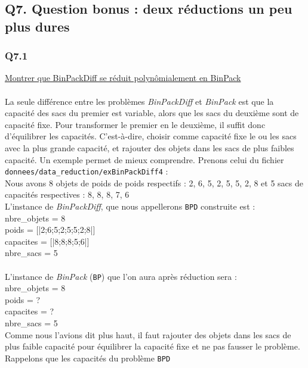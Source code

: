\subsection*{Q7. Question bonus : deux réductions un peu plus dures}


\subsubsection{Q7.1}

\underline{Montrer que BinPackDiff se réduit polynômialement en BinPack}
~\\~\\
La seule différence entre les problèmes \textit{BinPackDiff} et \textit{BinPack} est que la capacité des sacs du premier est variable, alors que les sacs du deuxième sont de capacité fixe. Pour transformer le premier en le deuxième, il suffit donc d'équilibrer les capacités. C'est-à-dire, choisir comme capacité fixe le ou les sacs avec la plus grande capacité, et rajouter des objets dans les sacs de plus faibles capacité. Un exemple permet de mieux comprendre. Prenons celui du fichier \verb+donnees/data_reduction/exBinPackDiff4+ :\\
Nous avons 8 objets de poids de poids respectifs : 2, 6, 5, 2, 5, 5, 2, 8 et 5 sacs de capacités respectives : 8, 8, 8, 7, 6\\
L'instance de \textit{BinPackDiff}, que nous appellerons \verb+BPD+ construite est :\\
nbre\_objets = 8\\
poids = [|2;6;5;2;5;5;2;8|]\\
capacites = [|8;8;8;5;6|]\\
nbre\_sacs = 5
~\\~\\
L'instance de \textit{BinPack} (\verb+BP+) que l'on aura après réduction sera :\\
nbre\_objets = 8\\
poids = ?\\
capacites = ?\\
nbre\_sacs = 5
~\\

Comme nous l'avions dit plus haut, il faut rajouter des objets dans les sacs de plus faible capacité pour équilibrer la capacité fixe et ne pas fausser le problème. Rappelons que les capacités du problème \verb+BPD+
